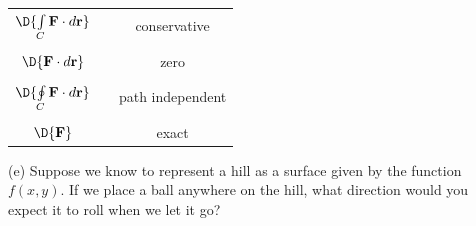 \documentclass[12pt]{amsart}
\numberwithin{equation}{section}
\begin{document}
\begin{center}
\begin{tabular}{cp{5cm}c}
	$\D{\int \limits_{C} \text{\bf F}\cdot d\text{\bf r}}$ & & conservative\\
	&&\\
	$\D{\text{\bf F}\cdot d\text{\bf r}}$ & & zero\\
	&&\\
	$\D{\oint \limits_{C} \text{\bf F}\cdot d\text{\bf r}}$ & & path independent\\
	&&\\
	$\D{\text{\bf F}}$ & & exact\\
\end{tabular}
\end{center}

\vspace{0.4cm}

(e) Suppose we know to represent a hill as a surface given by the function $f(x,y)$.  If we place a ball anywhere on the hill, what direction would you expect it to roll when we let it go?

 
\thispagestyle{empty}
\newpage
\thispagestyle{empty}
\end{document}
